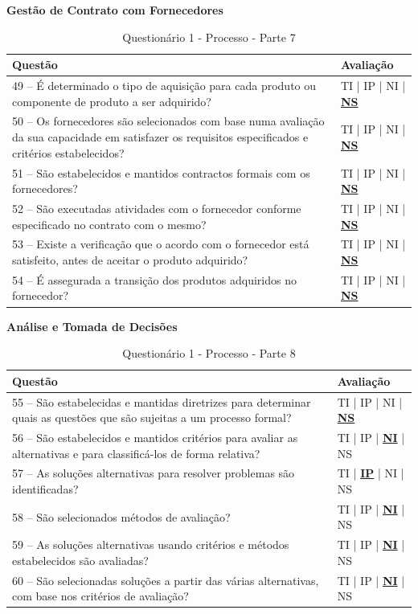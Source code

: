 \documentclass[openany,10pt,a4paper]{article}
\begin{document}
\begin{appendix}
	\begin{table}[H]
	\textbf{Gestão de Contrato com Fornecedores}
		\centering
		\caption{Questionário 1 - Processo - Parte 7}
		\begin{tabular}{|p{5in}p{1in}|}		
			\hline
			\textbf{Questão}  & \textbf{Avaliação}\\ 
			\hline
			49 – É determinado o tipo de aquisição para cada produto ou componente de produto a ser 
	adquirido?
	 & TI | IP | NI | \underline{\textbf{NS}} \\
			\hline
			50 – Os fornecedores são selecionados com base numa avaliação da sua capacidade em 
	satisfazer os requisitos especificados e critérios estabelecidos?
	 & TI | IP | NI | \underline{\textbf{NS}} \\
			\hline
			51 – São estabelecidos e mantidos contractos formais com os fornecedores?
	 & TI | IP | NI | \underline{\textbf{NS}} \\
			\hline
			52 – São executadas atividades com o fornecedor conforme especificado no contrato com o 
	mesmo?
	 & TI | IP | NI | \underline{\textbf{NS}} \\
			\hline
			53 – Existe a verificação que o acordo com o fornecedor está satisfeito, antes de aceitar o 
	produto adquirido?
	  & TI | IP | NI | \underline{\textbf{NS}} \\
			\hline
			54 – É assegurada a transição dos produtos adquiridos no fornecedor?
	 & TI | IP | NI | \underline{\textbf{NS}} \\
			\hline
		\end{tabular} 
	\end{table}
	
	\begin{table}[H]
	\textbf{Análise e Tomada de Decisões}
		\centering
		\caption{Questionário 1 - Processo - Parte 8}
		\begin{tabular}{|p{5in}p{1in}|}		
			\hline
			\textbf{Questão}  & \textbf{Avaliação}\\ 
			\hline
			55 – São estabelecidas e mantidas diretrizes para determinar quais as questões que são sujeitas 
	a um processo formal?
	 & TI | IP | NI | \underline{\textbf{NS}} \\
			\hline
			56 – São estabelecidos e mantidos critérios para avaliar as alternativas e para classificá-los de 
	forma relativa?
	 & TI | IP | \underline{\textbf{NI}} | NS \\
			\hline
			57 – As soluções alternativas para resolver problemas são identificadas?
	 & TI | \underline{\textbf{IP}} | NI | NS \\
			\hline
			58 – São selecionados métodos de avaliação?
	 & TI | IP | \underline{\textbf{NI}} | NS \\
			\hline
			59 – As soluções alternativas usando critérios e métodos estabelecidos são avaliadas?
	  & TI | IP | \underline{\textbf{NI}} | NS \\
			\hline
			60 – São selecionadas soluções a partir das várias alternativas, com base nos critérios de 
	avaliação?
	 & TI | IP | \underline{\textbf{NI}} | NS \\
			\hline
		\end{tabular} 
	\end{table}
	

\end{appendix}
\end{document}

